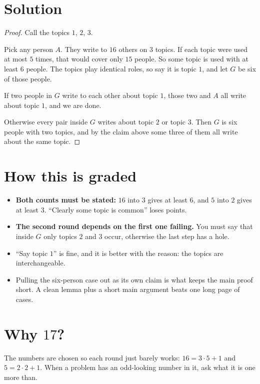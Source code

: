 \documentclass[11pt]{article}
\begin{document}
\section*{Solution}

\begin{proof}
Call the topics $1$, $2$, $3$.

Pick any person $A$. They write to $16$ others on $3$ topics. If each topic were used at most $5$ times, that would cover only $15$ people. So some topic is used with at least $6$ people. The topics play identical roles, so say it is topic $1$, and let $G$ be six of those people.

If two people in $G$ write to each other about topic $1$, those two and $A$ all write about topic $1$, and we are done.

Otherwise every pair inside $G$ writes about topic $2$ or topic $3$. Then $G$ is six people with two topics, and by the claim above some three of them all write about the same topic.
\end{proof}

\section*{How this is graded}
\begin{itemize}
  \item \textbf{Both counts must be stated:} $16$ into $3$ gives at least $6$, and $5$ into $2$ gives at least $3$. ``Clearly some topic is common'' loses points.
  \item \textbf{The second round depends on the first one failing.} You must say that inside $G$ only topics $2$ and $3$ occur, otherwise the last step has a hole.
  \item ``Say topic $1$'' is fine, and it is better with the reason: the topics are interchangeable.
  \item Pulling the six-person case out as its own claim is what keeps the main proof short. A clean lemma plus a short main argument beats one long page of cases.
\end{itemize}

\section*{Why $17$?}
The numbers are chosen so each round just barely works: $16 = 3 \cdot 5 + 1$ and $5 = 2 \cdot 2 + 1$. When a problem has an odd-looking number in it, ask what it is one more than.
\end{document}
